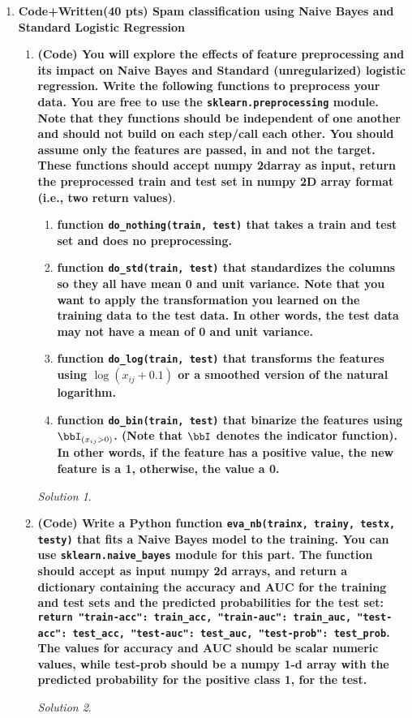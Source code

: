 \documentclass[a4paper,12pt]{article}
\theoremstyle{definition}
\theoremstyle{remark}
\newtheorem*{solution}{Solution}
\begin{document}
\begin{enumerate}
		\item{\bf Code+Written(40 pts) Spam classification using Naive Bayes and Standard Logistic Regression}
		\begin{enumerate}
			\item {\bf (Code) You will explore the effects of feature preprocessing and its impact on Naive Bayes and Standard (unregularized) logistic regression. Write the following functions to preprocess your data. You are free to use the \texttt{sklearn.preprocessing} module. Note that they functions should be independent of one another and should not build on each step/call each other. You should assume only the features are passed, in and not the target. These functions should accept numpy 2darray as input, return the preprocessed train and test set in numpy 2D array format (i.e., two return values)}.
				\begin{enumerate}
					\item {\bf  function \texttt{do\_nothing(train, test)} that takes a train and test set and does no preprocessing.}
					\item {\bf function \texttt{do\_std(train, test)} that standardizes the columns so they all have mean 0 and unit variance. Note that you want to apply the transformation you learned on the training data to the test data. In other words, the test data may not have a mean of 0 and unit variance.}
					\item {\bf function \texttt{do\_log(train, test)} that transforms the features using $\log(x_{ij} + 0.1)$ or a smoothed version of the natural logarithm.}
					\item {\bf function \texttt{do\_bin(train, test)} that binarize the features using $\bbI_{(x_{ij} >0)}$.  (Note that $\bbI$ denotes the indicator function). In other words, if the feature has a positive value, the new feature is a 1, otherwise, the value a 0.}
				\end{enumerate}

			\begin{solution}
				
			\end{solution}
			\item {\bf  (Code) Write a Python function \texttt{eva\_nb(trainx, trainy, testx, testy)} that fits a Naive Bayes model to the training. You can use \texttt{sklearn.naive\_bayes} module for this part. The function should accept as input numpy 2d arrays, and return a dictionary containing the accuracy and AUC for the training and test sets and the predicted probabilities for the test set: \\
				\texttt{return {"train-acc":
					train\_acc, "train-auc": train\_auc, "test-acc": test\_acc, "test-auc":
					test\_auc, "test-prob": test\_prob}}. \\
				The values for accuracy and AUC should be scalar
				numeric values, while test-prob should be a numpy 1-d array with the predicted probability for the positive class 1, for the test.}
			\begin{solution}
			

\end{solution}
\end{enumerate}
\end{enumerate}
\end{document}
